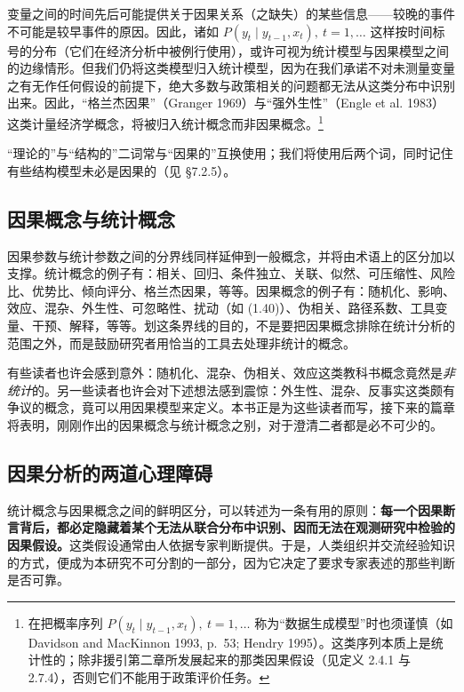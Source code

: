 \begin{remarkenv}
变量之间的时间先后可能提供关于因果关系（之缺失）的某些信息——较晚的事件不可能是较早事件的原因。因此，诸如 $P(y_t\mid y_{t-1},x_t),\ t=1,\dots$ 这样按时间标号的分布（它们在经济分析中被例行使用），或许可视为统计模型与因果模型之间的边缘情形。但我们仍将这类模型归入统计模型，因为在我们承诺不对未测量变量之有无作任何假设的前提下，绝大多数与政策相关的问题都无法从这类分布中识别出来。因此，“格兰杰因果”（Granger 1969）与“强外生性”（Engle et al. 1983）这类计量经济学概念，将被归入统计概念而非因果概念。\footnote{在把概率序列 $P(y_t\mid y_{t-1},x_t),\ t=1,\dots$ 称为“数据生成模型”时也须谨慎（如 Davidson and MacKinnon 1993, p.~53; Hendry 1995）。这类序列本质上是统计性的；除非援引第二章所发展起来的那类因果假设（见定义 2.4.1 与 2.7.4），否则它们不能用于政策评价任务。}
\end{remarkenv}

\begin{remarkenv}
“理论的”与“结构的”二词常与“因果的”互换使用；我们将使用后两个词，同时记住有些结构模型未必是因果的（见 \S 7.2.5）。
\end{remarkenv}

\subsection*{因果概念与统计概念}

因果参数与统计参数之间的分界线同样延伸到一般概念，并将由术语上的区分加以支撑。统计概念的例子有：相关、回归、条件独立、关联、似然、可压缩性、风险比、优势比、倾向评分、格兰杰因果，等等。因果概念的例子有：随机化、影响、效应、混杂、外生性、可忽略性、扰动（如 \textup{(1.40)}）、伪相关、路径系数、工具变量、干预、解释，等等。划这条界线的目的，不是要把因果概念排除在统计分析的范围之外，而是鼓励研究者用恰当的工具去处理非统计的概念。

有些读者也许会感到意外：随机化、混杂、伪相关、效应这类教科书概念竟然是\emph{非统计}的。另一些读者也许会对下述想法感到震惊：外生性、混杂、反事实这类颇有争议的概念，竟可以用因果模型来定义。本书正是为这些读者而写，接下来的篇章将表明，刚刚作出的因果概念与统计概念之别，对于澄清二者都是必不可少的。

\subsection*{因果分析的两道心理障碍}

统计概念与因果概念之间的鲜明区分，可以转述为一条有用的原则：\textbf{每一个因果断言背后，都必定隐藏着某个无法从联合分布中识别、因而无法在观测研究中检验的因果假设。}这类假设通常由人依据专家判断提供。于是，人类组织并交流经验知识的方式，便成为本研究不可分割的一部分，因为它决定了要求专家表述的那些判断是否可靠。

